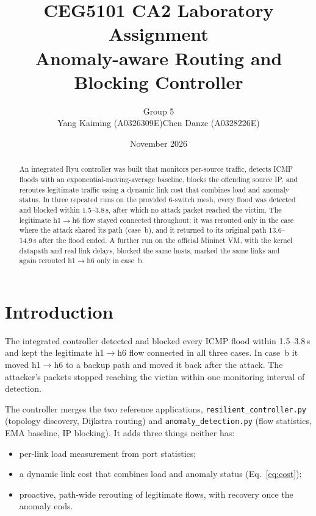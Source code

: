 \documentclass[11pt,a4paper]{article}
\title{\textbf{CEG5101 CA2 Laboratory Assignment}\\[4pt]
       \large Anomaly-aware Routing and Blocking Controller}
\author{Group 5\\[2pt] Yang Kaiming (A0326309E)\qquad Chen Danze (A0328226E)}
\date{November 2026}
\newcommand{\ra}{\ensuremath{\rightarrow}}
\newcommand{\code}[1]{\texttt{#1}}
\begin{document}
\maketitle

\begin{abstract}
\noindent
An integrated Ryu controller was built that monitors per-source traffic, detects ICMP floods with an
exponential-moving-average baseline, blocks the offending source IP, and reroutes legitimate traffic using a
dynamic link cost that combines load and anomaly status. In three repeated runs on the provided 6-switch mesh,
every flood was detected and blocked within 1.5--3.8\,s, after which no attack packet reached the victim. The
legitimate h1\ra h6 flow stayed connected throughout; it was rerouted only in the case where the attack shared
its path (case~b), and it returned to its original path 13.6--14.9\,s after the flood ended. A further run on
the official Mininet VM, with the kernel datapath and real link delays, blocked the same hosts, marked the same
links and again rerouted h1\ra h6 only in case~b.
\end{abstract}

\section{Introduction}

The integrated controller detected and blocked every ICMP flood within 1.5--3.8\,s and kept the legitimate
h1\ra h6 flow connected in all three cases. In case~b it moved h1\ra h6 to a backup path and moved it back after
the attack. The attacker's packets stopped reaching the victim within one monitoring interval of detection.

The controller merges the two reference applications, \code{resilient\_controller.py} (topology discovery,
Dijkstra routing) and \code{anomaly\_detection.py} (flow statistics, EMA baseline, IP blocking). It adds three
things neither has:
\begin{itemize}
  \item per-link load measurement from port statistics;
  \item a dynamic link cost that combines load and anomaly status (Eq.~\ref{eq:cost});
  \item proactive, path-wide rerouting of legitimate flows, with recovery once the anomaly ends.
\end{itemize}
\end{document}
